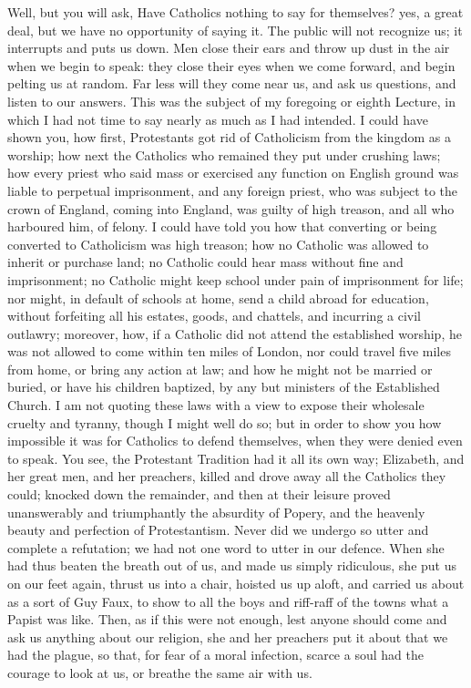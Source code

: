 Well, but you will ask, Have Catholics nothing to say
for themselves? yes, a great deal, but we have no
opportunity of saying it. The public will not recognize
us; it interrupts and puts us down. Men close their ears
and throw up dust in the air when we begin to speak: they
close their eyes when we come forward, and begin pelting
us at random. Far less will they come near us, and ask us
questions, and listen to our answers. This was the
subject of my foregoing or eighth Lecture, in which I had
not time to say nearly as much as I had intended. I could
have shown you, how first, Protestants got rid of
Catholicism from the kingdom as a worship; how next the
Catholics who remained they put under crushing laws; how
every priest who said mass or exercised any function on
English ground was liable to perpetual imprisonment, and
any foreign priest, who was subject to the crown of
England, coming into England, was guilty of high treason,
and all who harboured him, of felony. I could have told
you how that converting or being converted to Catholicism
was high treason; how no Catholic was allowed to inherit
or purchase land; no Catholic could hear mass without
fine and imprisonment; no Catholic might keep school
under pain of imprisonment for life; nor might, in
default of schools at home, send a child abroad for
education, without forfeiting all his estates, goods, and
chattels, and incurring a civil outlawry; moreover, how,
if a Catholic did not attend the established worship, he
was not allowed to come within ten miles of London, nor
could travel five miles from home, or bring any action at
law; and how he might not be married or buried, or have
his children baptized, by any but ministers of the
Established Church. I am not quoting these laws with a
view to expose their wholesale cruelty and tyranny,
though I might well do so; but in order to show you how
impossible it was for Catholics to defend themselves,
when they were denied even to speak. You see, the
Protestant Tradition had it all its own way; Elizabeth,
and her great men, and her preachers, killed and drove
away all the Catholics they could; knocked down the
remainder, and then at their leisure proved unanswerably
and triumphantly the absurdity of Popery, and the
heavenly beauty and perfection of Protestantism. Never
did we undergo so utter and complete a refutation; we had
not one word to utter in our defence. When she had thus
beaten the breath out of us, and made us simply
ridiculous, she put us on our feet again, thrust us into
a chair, hoisted us up aloft, and carried us about as a
sort of Guy Faux, to show to all the boys and riff-raff
of the towns what a Papist was like. Then, as if this
were not enough, lest anyone should come and ask us
anything about our religion, she and her preachers put it
about that we had the plague, so that, for fear of a
moral infection, scarce a soul had the courage to look at
us, or breathe the same air with us.

